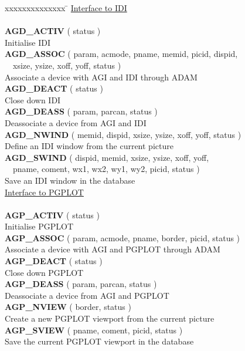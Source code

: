\begin{tabbing}
xxxxxxxxxxxxxx \= \kill
\underline{Interface to IDI}\\ \\
{\bf AGD\_ACTIV} \> ( status )\\
                 \> Initialise IDI\\[1ex]
{\bf AGD\_ASSOC} \> ( param, acmode, pname, memid, picid, dispid,\\
                 \> ~~xsize, ysize, xoff, yoff, status )\\
                 \> Associate a device with AGI and IDI through ADAM\\[1ex]
{\bf AGD\_DEACT} \> ( status )\\
                 \> Close down IDI\\[1ex]
{\bf AGD\_DEASS} \> ( param, parcan, status )\\
                 \> Deassociate a device from AGI and IDI\\[1ex]
{\bf AGD\_NWIND} \> ( memid, dispid, xsize, ysize, xoff, yoff, status )\\
                 \> Define an IDI window from the current picture\\[1ex]
{\bf AGD\_SWIND} \> ( dispid, memid, xsize, ysize, xoff, yoff,\\
                 \> ~~pname, coment, wx1, wx2, wy1, wy2, picid, status )\\
                 \> Save an IDI window in the database\\[2ex]

\underline{Interface to PGPLOT}\\ \\
{\bf AGP\_ACTIV} \> ( status )\\
                 \> Initialise PGPLOT\\[1ex]
{\bf AGP\_ASSOC} \> ( param, acmode, pname, border, picid, status )\\
                 \> Associate a device with AGI and PGPLOT through ADAM\\[1ex]
{\bf AGP\_DEACT} \> ( status )\\
                 \> Close down PGPLOT\\[1ex]
{\bf AGP\_DEASS} \> ( param, parcan, status )\\
                 \> Deassociate a device from AGI and PGPLOT\\[1ex]
{\bf AGP\_NVIEW} \> ( border, status )\\
                 \> Create a new PGPLOT viewport from the current picture\\[1ex]
{\bf AGP\_SVIEW} \> ( pname, coment, picid, status )\\
                 \> Save the current PGPLOT viewport in the database\\[2ex]


\end{tabbing}
